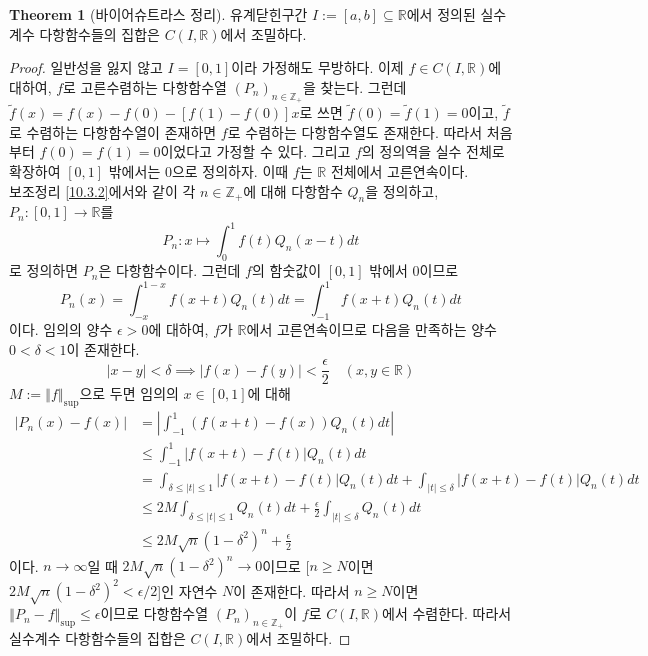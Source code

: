 \documentclass[11pt]{book}
\numberwithin{equation}{chapter}
\def\ZZ{\mathbb{Z}}
\def\RR{\mathbb{R}}
\def\eps{\epsilon}
\newcommand{\abs}[1]{\left\vert#1\right\vert}
\newcommand{\norm}[1]{\left\Vert#1\right\Vert}
\theoremstyle{definition}
\newtheorem{thm}{Theorem}[section]
\begin{document}
\begin{thm}[바이어슈트라스 정리]
    유계닫힌구간 \(I := [a, b] \subseteq \RR\)에서 정의된 실수계수 다항함수들의 집합은 \(C(I, \RR)\)에서 조밀하다.
\end{thm}
\begin{proof}
    일반성을 잃지 않고 \(I = [0, 1]\)이라 가정해도 무방하다. 이제 \(f \in C(I, \RR)\)에 대하여, \(f\)로 고른수렴하는 다항함수열 \((P_n)_{n \in \ZZ_+}\)을 찾는다. 그런데 \(\tilde{f}(x) = f(x) - f(0) - [f(1) - f(0)]x \)로 쓰면 \(\tilde{f}(0) = \tilde{f}(1) = 0\)이고, \(\tilde{f}\)로 수렴하는 다항함수열이 존재하면 \(f\)로 수렴하는 다항함수열도 존재한다. 따라서 처음부터 \(f(0) = f(1) = 0\)이었다고 가정할 수 있다. 그리고 \(f\)의 정의역을 실수 전체로 확장하여 \([0, 1]\) 밖에서는 0으로 정의하자. 이때 \(f\)는 \(\RR\) 전체에서 고른연속이다.\\
    보조정리 \ref{10.3.2}에서와 같이 각 \(n \in \ZZ_+\)에 대해 다항함수 \(Q_n\)을 정의하고, \(P_n : [0, 1] \to \RR\)를
    \[
    P_n : x \mapsto \int_0^1 f(t) Q_n(x - t) dt  
    \]
    로 정의하면 \(P_n\)은 다항함수이다. 그런데 \(f\)의 함숫값이 \([0, 1]\) 밖에서 0이므로
    \[
    P_n(x) = \int_{-x}^{1-x} f(x+t)Q_n(t) dt = \int_{-1}^1 f(x+t) Q_n(t) dt
    \]
    이다. 임의의 양수 \(\eps > 0\)에 대하여, \(f\)가 \(\RR\)에서 고른연속이므로 다음을 만족하는 양수 \(0 < \delta < 1\)이 존재한다.
    \[
    \abs{x - y} < \delta \implies \abs{f(x) - f(y)} < \frac{\eps}{2} \quad (x, y \in \RR)
    \]
    \(M := \norm{f}_{\sup}\)으로 두면 임의의 \(x \in [0, 1]\)에 대해
    \begin{align*}
        \abs{P_n(x) - f(x)} &= \abs{\int_{-1}^1 (f(x+t) - f(x))Q_n(t) dt}\\
        &\le \int_{-1}^1 \abs{f(x+t)-f(t)} Q_n(t) dt\\
        &= \int_{\delta \le \abs{t} \le 1} \abs{f(x+t)-f(t)} Q_n(t) dt + \int_{\abs{t} \le \delta} \abs{f(x+t)-f(t)} Q_n(t) dt\\
        &\le 2M \int_{\delta \le \abs{t} \le 1} Q_n(t) dt + \frac{\eps}{2} \int_{\abs{t} \le \delta} Q_n(t) dt\\
        &\le 2M\sqrt{n}(1-\delta^2)^n + \frac{\eps}{2}
    \end{align*}
    이다. \(n \to \infty\)일 때 \(2M\sqrt{n}(1-\delta^2)^n \to 0\)이므로 [\(n \ge N\)이면 \(2M\sqrt{n}(1 - \delta^2)^2 < \eps/2\)]인 자연수 \(N\)이 존재한다. 따라서 \(n \ge N\)이면 \(\norm{P_n - f}_{\sup} \le \eps\)이므로 다항함수열 \((P_n)_{n \in \ZZ_+}\)이 \(f\)로 \(C(I, \RR)\)에서 수렴한다. 따라서 실수계수 다항함수들의 집합은 \(C(I, \RR)\)에서 조밀하다.
\end{proof}
\end{document}
